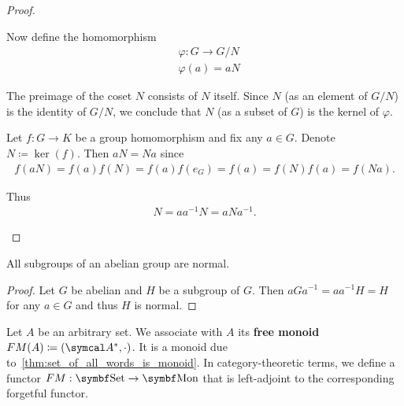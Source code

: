 \begin{proof}
\begin{description}
    Now define the homomorphism
    \begin{align*}
      &\varphi: G \to G / N \\
      &\varphi(a) = aN
    \end{align*}

    The preimage of the coset \( N \) consists of \( N \) itself. Since \( N \) (as an element of \( G / N \)) is the identity of \( G / N \), we conclude that \( N \) (as a subset of \( G \)) is the kernel of \( \varphi \).

     Let \( f: G \to K \) be a group homomorphism and fix any \( a \in G \). Denote \( N \coloneqq \ker(f) \). Then \( aN = Na \) since
    \begin{align*}
      f(aN)
      =
      f(a) f(N)
      =
      f(a) f(e_G)
      =
      f(a)
      =
      f(N) f(a)
      =
      f(Na).
    \end{align*}

    Thus
    \begin{align*}
      N = aa^{-1}N = aNa^{-1}.
    \end{align*}
  \end{description}
\end{proof}

\begin{proposition}\label{thm:abelian_normal_subgroups}
  All subgroups of an abelian group are normal.
\end{proposition}
\begin{proof}
  Let \( G \) be abelian and \( H \) be a subgroup of \( G \). Then \( aGa^{-1} = aa^{-1}H = H \) for any \( a \in G \) and thus \( H \) is normal.
\end{proof}

\begin{definition}\label{def:free_monoid}\cite[306]{Knapp2016BAlg}
  Let \( A \) be an arbitrary set. We associate with \( A \) its \textbf{free monoid} \( FM(A) \coloneqq (\Cal{A}^{*}, \cdot) \). It is a monoid due to~\cref{thm:set_of_all_words_is_monoid}. In category-theoretic terms, we define a functor \( FM: \Bold{Set} \to \Bold{Mon} \) that is left-adjoint to the corresponding forgetful functor.
\end{definition}

